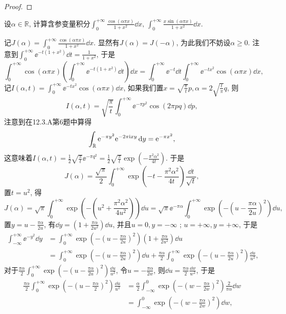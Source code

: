 \begin{quizb}
\begin{proof}
\end{proof}
\woe 设\(\alpha\in\mathbb{R}\), 计算含参变量积分\(\int_{0}^{+\infty}\frac{\cos\left(\alpha\pi x\right)}{1+x^2}\dd x,\,\int_{0}^{+\infty}\frac{x\sin\left(\alpha\pi x\right)}{1+x^2}\dd x\).
\begin{solution}
	记\(J(\alpha)=\int_{0}^{+\infty}\frac{\cos\left(\alpha\pi x\right)}{1+x^2}\dd x.\) 显然有\(J(\alpha)=J(-\alpha)\), 为此我们不妨设\(\alpha\geqslant 0\). 注意到\(\int_{0}^{+\infty}\ee^{-t(1+x^2)}\dd t=\frac{1}{1+x^2}\), 于是\[\int_{0}^{+\infty}\cos\left(\alpha\pi x\right)\left(\int_{0}^{+\infty}\ee^{-t(1+x^2)}\dd t\right)\dd x=\int_{0}^{+\infty}\ee^{-t}\dd t\int_{0}^{+\infty}\ee^{-tx^2}\cos\left(\alpha\pi x\right)\dd x,\]记\(I(\alpha,t)=\int_{0}^{+\infty}\ee^{-tx^2}\cos\left(\alpha\pi x\right)\dd x\), 如果我们置\(x=\sqrt{\frac{\pi}{t}}p,\alpha=2\sqrt{\frac{t}{\pi}}q\), 则\[I(\alpha,t)=\sqrt{\frac{\pi}{t}}\int_{0}^{+\infty}\ee^{-\pi p^2}\cos\left(2\pi pq\right)\dd p,\]注意到在12.3.A第6题中算得\[\int_{\mathbb{R}}\mathrm{e}^{-\pi y^2}\mathrm{e}^{-2\pi\mathrm{i} xy}\,\mathrm{d} y=\mathrm{e}^{-\pi x^2},\]这意味着\(I(\alpha,t)=\frac{1}{2}\sqrt{\frac{\pi}{t}}\ee^{-\pi q^2}=\frac{1}{2}\sqrt{\frac{\pi}{t}}\exp\left(-\frac{\pi^2\alpha^2}{4t}\right)\). 于是\[J(\alpha)=\frac{\sqrt{\pi}}{2}\int_{0}^{+\infty}\exp\left(-t-\frac{\pi^2\alpha^2}{4t}\right)\frac{\dd t}{\sqrt{t}},\]置\(t=u^2\), 得\[J(\alpha)=\sqrt{\pi}\int_{0}^{+\infty}\exp\left(-\left(u^2+\frac{\pi^2\alpha^2}{4u^2}\right)\right)\dd u=\sqrt{\pi}\ee^{-\pi\alpha}\int_{0}^{+\infty}\exp\left(-\left(u-\frac{\pi\alpha}{2u}\right)^2\right)\dd u,\]置\(y=u-\frac{\pi\alpha}{2u}\), 有\(\dd y=\left(1+\frac{\pi\alpha}{2u^2}\right)\dd u\), 并且\(u=0,y=-\infty\) ; \(u=+\infty,y=+\infty\), 于是\[\begin{split}
		\int_{-\infty}^{+\infty}\ee^{-y^2}\dd y&=\int_{0}^{+\infty}\exp\left(-\left(u-\frac{\pi\alpha}{2u}\right)^2\right)\left(1+\frac{\pi\alpha}{2u^2}\right)\dd u\\&=\int_{0}^{+\infty}\exp\left(-\left(u-\frac{\pi\alpha}{2u}\right)^2\right)\dd u+\frac{\pi\alpha}{2}\int_{0}^{+\infty}\exp\left(-\left(u-\frac{\pi\alpha}{2u}\right)^2\right)\frac{\dd u}{u^2},
	\end{split}\]
	对于\(\frac{\pi\alpha}{2}\int_{0}^{+\infty}\exp\left(-\left(u-\frac{\pi\alpha}{2u}\right)^2\right)\frac{\dd u}{u^2}\), 令\(u=-\frac{\pi\alpha}{2w}\), 则\(\dd u=\frac{\pi\alpha}{2}\frac{\dd w}{w^2}\), 于是\[\begin{split}
		\frac{\pi\alpha}{2}\int_{0}^{+\infty}\exp\left(-\left(u-\frac{\pi\alpha}{2}\right)^2\right)\frac{\dd u}{u^2}&=\frac{\alpha}{2}\int_{-\infty}^{0}\exp\left(-\left(w-\frac{\pi\alpha}{2w}\right)^2\right)\frac{2}{\pi\alpha}\dd w\\&=\int_{-\infty}^{0}\exp\left(-\left(w-\frac{\pi\alpha}{2w}\right)^2\right)\dd w,

\end{split}\]
\end{solution}
\end{quizb}
